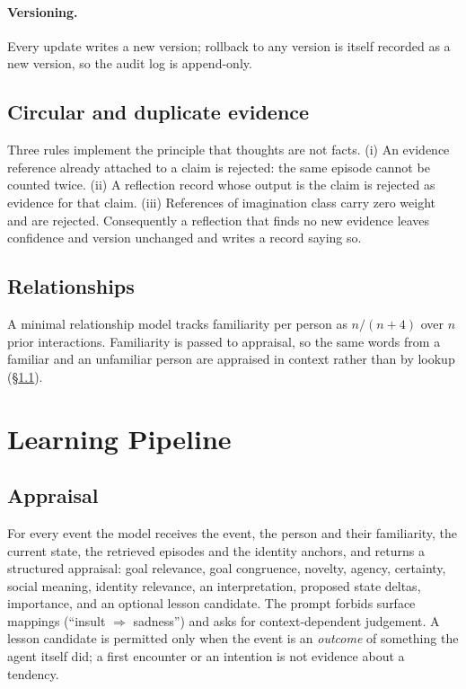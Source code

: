 \documentclass[11pt]{article}
\begin{document}
\paragraph{Versioning.} Every update writes a new version; rollback to any version is itself recorded as a new version, so the audit log is append-only.

\subsection{Circular and duplicate evidence}\label{sec:circular}
Three rules implement the principle that thoughts are not facts. (i) An evidence reference already attached to a claim is rejected: the same episode cannot be counted twice. (ii) A reflection record whose output is the claim is rejected as evidence for that claim. (iii) References of imagination class carry zero weight and are rejected. Consequently a reflection that finds no new evidence leaves confidence and version unchanged and writes a record saying so.

\subsection{Relationships}
A minimal relationship model tracks familiarity per person as $n/(n+4)$ over $n$ prior interactions. Familiarity is passed to appraisal, so the same words from a familiar and an unfamiliar person are appraised in context rather than by lookup (\S\ref{sec:appraisal}).

\section{Learning Pipeline}\label{sec:pipeline}
\subsection{Appraisal}\label{sec:appraisal}
For every event the model receives the event, the person and their familiarity, the current state, the retrieved episodes and the identity anchors, and returns a structured appraisal: goal relevance, goal congruence, novelty, agency, certainty, social meaning, identity relevance, an interpretation, proposed state deltas, importance, and an optional lesson candidate. The prompt forbids surface mappings (``insult $\Rightarrow$ sadness'') and asks for context-dependent judgement. A lesson candidate is permitted only when the event is an \emph{outcome} of something the agent itself did; a first encounter or an intention is not evidence about a tendency.
\end{document}
